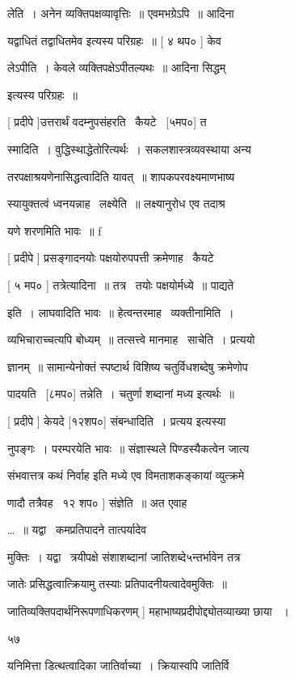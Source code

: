 \documentclass[11pt, openany]{book}
\begin{document}
लेति~। अनेन व्यक्तिपक्षव्यावृत्तिः~॥ एवमभग्रेऽपि~॥ आदिना 

{\qt यद्वाधितं तद्वाधितमेव} इत्यस्य परिग्रहः~॥ [ ४ थप० ] केव \textendash\ 

लेऽपीति~। केवले व्यक्तिपक्षेऽपीतल्यथः~॥ आदिना {\qt सिद्धम्} 

इत्यस्य परिग्रहः~॥ 

[ प्रदीपे ]उत्तरार्थं वदम्नुपसंहरति \textendash\ कैयटे \textendash\ [५मप०] त \textendash\ 

स्मादिति~। वुद्धिस्थाद्धेतोरित्यर्थः~। सकलशास्त्रव्यवस्थाया अन्य \textendash\ 

तरपक्षाश्रयणेनासिद्धत्वादिति यावत्~॥ शापकपरवक्ष्यमाणभाष्य \textendash\ 

स्यायुक्तत्वं ध्वनयन्नाह \textendash\ लक्ष्येति~॥ लक्ष्यानुरोध एव तदाश्र \textendash\ 

यणे शरणमिति भावः~॥ f 

[ प्रदीपे ] प्रसङ्गादनयोः पक्षयोरुपपत्ती क्रमेणाह \textendash\ कैयटे \textendash\ 

[ ५ मप० ] तत्रेत्यादिना~॥ तत्र \textendash\ तयोः पक्षयोर्मध्ये~॥ पाद्यते 

इति~। लाघवादिति भावः~॥ हेत्वन्तरमाह \textendash\ व्यक्तीनामिति~। 

व्यभिचाराच्चत्यपि बोध्यम्~॥ तत्सत्त्वे मानमाह \textendash\ साचेति~। प्रत्ययो 

ज्ञानम्~॥ सामान्येनोक्तं स्पष्टार्थ विशिष्य चतुर्विधशब्देषु क्रमेणोप \textendash\ 


पादयति \textendash\ [८मप०] तन्नेति~। चतुर्णा शब्दानां मध्य इत्यर्थः~॥ 

[ प्रदीपे ] केयदे [१२शप०] संबन्धादिति~। प्रत्यय इत्यस्या \textendash\ 

नुपङ्गः~। परम्परयेति भावः~॥ संज्ञास्थले पिण्डस्यैकत्वेन जात्य \textendash\ 

संभवात्तत्र कथं निर्वाह इति मध्ये एव विमताशकङ्कायां व्युत्क्रमे \textendash\ 

णादौ तत्रैवह \textendash\ १२ शप० ] संज्ञेति~॥ अत एवाह \textendash\ 

\ldots~॥ यद्वा \textendash\ कमप्रतिपादने तात्पर्यादेव \textendash\ 

मुक्तिः~। यद्वा \textendash\ त्रयीपक्षे संशाशब्दानां जातिशब्दे५न्तर्भावेन तत्र 

जातेः प्रसिद्धत्वात्क्रियामु तस्याः प्रतिपादनीयत्वादेवमुक्तिः~॥ 

जातिव्यक्तिपदार्थनिरूपणाधिकरणम् ] महाभाष्यप्रदीपोद्द्योतव्याख्या छाया
~। 

५७ 

यनिमित्ता डित्थत्वादिका जातिर्वाच्या~। क्रियास्वपि जातिर्वि \textendash\ 
\end{document}
